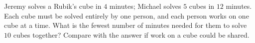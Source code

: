 Jeremy solves a Rubik's cube in $4$ minutes; Michael solves $5$ cubes in $12$ minutes. Each cube must be solved entirely by one person, and each person works on one cube at a time. What is the fewest number of minutes needed for them to solve $10$ cubes together? Compare with the answer if work on a cube could be shared.
